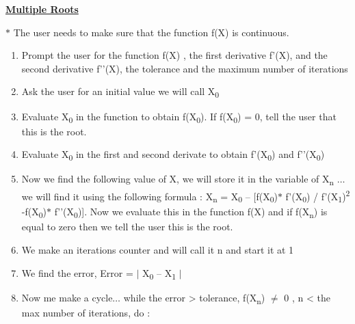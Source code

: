 \documentclass[12pt]{article}
\renewcommand{\_}{\kern-1.5pt\textunderscore\kern-1.5pt}
\begin{document}
{\fontsize{16pt}{19.2pt}\selectfont \textbf{\uline{Multiple Roots }}\par}\par

$\ast$ The user needs to make sure that the function f(X) is continuous. \par

\begin{enumerate}
	\item Prompt the user for the function f(X) , the first derivative f’(X), and the second derivative f’’(X), the tolerance and the maximum number of iterations\par

	\item Ask the user for an initial value we will call X\textsubscript{0 }\par

	\item Evaluate X\textsubscript{0 }in the function to obtain f(X\textsubscript{0}).  If f(X\textsubscript{0}) = 0, tell the user that this is the root. \par

	\item Evaluate X\textsubscript{0 }in the first and second derivate to obtain f’(X\textsubscript{0}) and f’’(X\textsubscript{0})\par

	\item Now we find the following value of X, we will store it in the variable of X\textsubscript{n }$ \ldots $  we will find it using the following formula : X\textsubscript{n }= X\textsubscript{0 }– [f(X\textsubscript{0})$\ast$ f’(X\textsubscript{0}) / f’(X\textsubscript{1})\textsuperscript{2 }-f(X\textsubscript{0})$\ast$ f’’(X\textsubscript{0})]. Now we evaluate this in the function f(X) and if f(X\textsubscript{n}) is equal to zero then we tell the user this is the root. \par

	\item We make an iterations counter and will call it n and start it at 1\par

	\item We find the error, Error = $ \vert $  X\textsubscript{0} – X\textsubscript{1} $ \vert $ \par

	\item Now me make a cycle$ \ldots $  while the error > tolerance, f(X\textsubscript{n}) $ \neq $  0 , n < the max number of iterations, do :\par


\end{enumerate}
\end{document}
